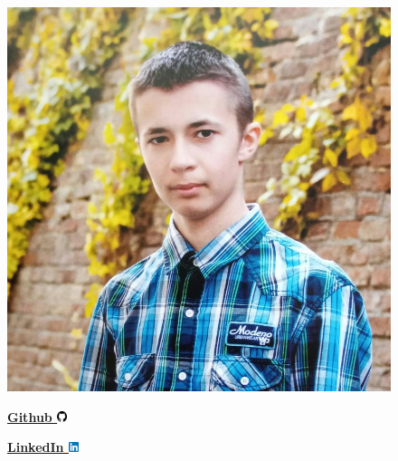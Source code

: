 \hypersetup{
    colorlinks=false,
    urlbordercolor=white
}


\begin{figure}
    \begin{flushright}
        \includegraphics[width=0.2\linewidth]{images/profile.jpeg}

        {
            
            \vspace{0.2cm}
            \textbf{
                {\href{https://github.com/LostHopes}{Github \includegraphics[width=0.30cm]{images/github.png}}}
            }

            \vspace{0.2cm}
            \textbf{
                {\href{https://www.linkedin.com/in/arsen-melnychuk-840b5126b/}{LinkedIn \includegraphics[width=0.30cm]{images/linkedin.png}}}
            }
        }
    \end{flushright}
\end{figure}
